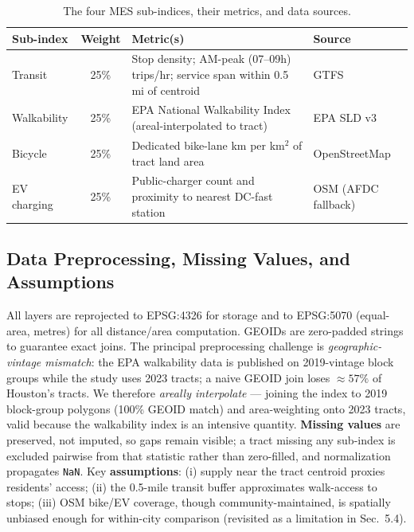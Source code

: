 \documentclass[11pt]{article}
\begin{document}
\begin{table}[htbp]
\centering
\caption{The four MES sub-indices, their metrics, and data sources.}
\label{tab:subindex}
\small
\begin{tabularx}{\textwidth}{l c Y l}
\toprule
\textbf{Sub-index} & \textbf{Weight} & \textbf{Metric(s)} & \textbf{Source} \\
\midrule
Transit & 25\% & Stop density; AM-peak (07--09h) trips/hr; service span within 0.5 mi of centroid & GTFS \\
Walkability & 25\% & EPA National Walkability Index (areal-interpolated to tract) & EPA SLD v3 \\
Bicycle & 25\% & Dedicated bike-lane km per km$^2$ of tract land area & OpenStreetMap \\
EV charging & 25\% & Public-charger count and proximity to nearest DC-fast station & OSM (AFDC fallback) \\
\bottomrule
\end{tabularx}
\end{table}

\subsection{Data Preprocessing, Missing Values, and Assumptions}
All layers are reprojected to EPSG:4326 for storage and to EPSG:5070 (equal-area,
metres) for all distance/area computation. GEOIDs are zero-padded strings to
guarantee exact joins. The principal preprocessing challenge is
\emph{geographic-vintage mismatch}: the EPA walkability data is published on
2019-vintage block groups while the study uses 2023 tracts; a naive GEOID join
loses $\approx57\%$ of Houston's tracts. We therefore \emph{areally interpolate}
--- joining the index to 2019 block-group polygons (100\% GEOID match) and
area-weighting onto 2023 tracts, valid because the walkability index is an
intensive quantity. \textbf{Missing values} are preserved, not imputed, so gaps
remain visible; a tract missing any sub-index is excluded pairwise from that
statistic rather than zero-filled, and normalization propagates \texttt{NaN}. Key
\textbf{assumptions}: (i) supply near the tract centroid proxies residents'
access; (ii) the 0.5-mile transit buffer approximates walk-access to stops;
(iii) OSM bike/EV coverage, though community-maintained, is spatially unbiased
enough for within-city comparison (revisited as a limitation in Sec.~5.4).
\end{document}
